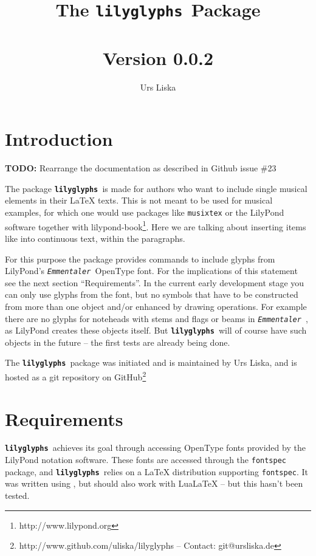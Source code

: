 \documentclass{article}
\newcommand*{\lilyglyphs}{\texttt{\textbf{lilyglyphs\,}}}
\newcommand*{\emmentaler}{\texttt{\textit{Emmentaler }}}
\begin{document}
\title{The \lilyglyphs Package\\~\\
	\normalsize Version 0.0.2}
\author{Urs Liska}

\maketitle
\tableofcontents

\pagebreak
\section{Introduction}
{\color{red} \textbf{TODO:} Rearrange the documentation as described in Github issue \#23}

The package \lilyglyphs is made for authors who want to include single musical elements in their \LaTeX{} texts. 
This is not meant to be used for musical examples, for which one would use packages like \texttt{musixtex} or the LilyPond software together with lilypond-book\footnote{http://www.lilypond.org}. 
Here we are talking about inserting items like \lilyRFZ into continuous text, within the paragraphs.

For this purpose the package provides commands to include glyphs from LilyPond's \emmentaler OpenType font. 
For the implications of this statement see the next section \enquote{Requirements}. 
In the current early development stage you can only use glyphs from the font, but no symbols that have to be constructed from more than one object and/or enhanced by drawing operations. 
For example there are no glyphs for noteheads with stems and flags or beams in \emmentaler, as LilyPond creates these objects itself. 
But \lilyglyphs will of course have such objects in the future -- the first tests are already being done.

The \lilyglyphs package was initiated and is maintained by Urs Liska, and is hosted as a git repository on GitHub\footnote{http://www.github.com/uliska/lilyglyphs -- Contact: git@ursliska.de}

\section{Requirements}
\lilyglyphs achieves its goal through accessing OpenType fonts provided by the LilyPond notation software. 
These fonts are accessed through the \texttt{fontspec} package, and \lilyglyphs relies on a \LaTeX{} distribution supporting \texttt{fontspec}. 
It was written using \XeLaTeX, but should also work with LuaLaTeX -- but this hasn't been tested.
\end{document}
